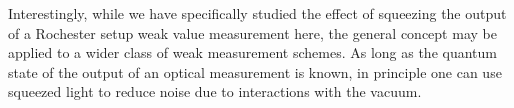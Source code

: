 Interestingly, while we have specifically studied the effect of squeezing the output of a Rochester setup weak value measurement here, the general concept may be applied to a wider class of weak measurement schemes.  As long as the quantum state of the output of an optical measurement is known, in principle one can use squeezed light to reduce noise due to interactions with the vacuum.  


